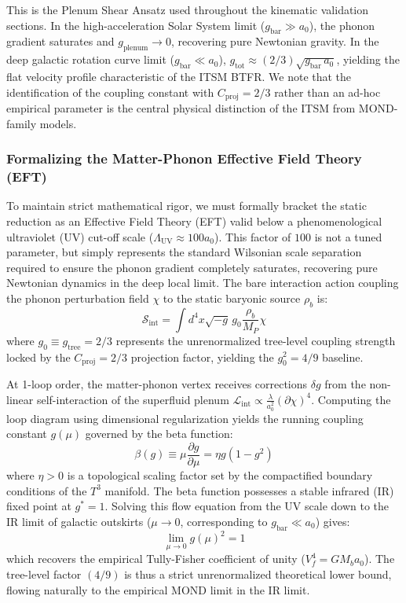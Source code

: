 \documentclass[aps,prd,10pt,twocolumn,superscriptaddress,nofootinbib,floatfix]{revtex4-2}
\begin{document}
This is the Plenum Shear Ansatz used throughout the kinematic validation sections. In the high-acceleration Solar System limit ($g_{\text{bar}} \gg a_0$), the phonon gradient saturates and $g_{\text{plenum}} \to 0$, recovering pure Newtonian gravity. In the deep galactic rotation curve limit ($g_{\text{bar}} \ll a_0$), $g_{\text{tot}} \approx (2/3)\sqrt{g_{\text{bar}}\,a_0}$, yielding the flat velocity profile characteristic of the ITSM BTFR. We note that the identification of the coupling constant with $C_{\text{proj}} = 2/3$ rather than an ad-hoc empirical parameter is the central physical distinction of the ITSM from MOND-family models. \subsubsection{Formalizing the Matter-Phonon Effective Field Theory (EFT)}
To maintain strict mathematical rigor, we must formally bracket the static reduction as an Effective Field Theory (EFT) valid below a phenomenological ultraviolet (UV) cut-off scale ($\Lambda_{\text{UV}} \approx 100 a_0$). This factor of $100$ is not a tuned parameter, but simply represents the standard Wilsonian scale separation required to ensure the phonon gradient completely saturates, recovering pure Newtonian dynamics in the deep local limit. The bare interaction action coupling the phonon perturbation field $\chi$ to the static baryonic source $\rho_b$ is:
\begin{equation}
\mathcal{S}_{\text{int}} = \int d^4x \sqrt{-g} \, g_0 \frac{\rho_b}{M_P} \chi
\end{equation}
where $g_0 \equiv g_{\text{tree}} = 2/3$ represents the unrenormalized tree-level coupling strength locked by the $C_{\text{proj}} = 2/3$ projection factor, yielding the $g_0^2 = 4/9$ baseline.

At 1-loop order, the matter-phonon vertex receives corrections $\delta g$ from the non-linear self-interaction of the superfluid plenum $\mathcal{L}_{\text{int}} \propto \frac{\lambda}{a_0^2} (\partial\chi)^4$. Computing the loop diagram using dimensional regularization yields the running coupling constant $g(\mu)$ governed by the beta function:
\begin{equation}
\beta(g) \equiv \mu \frac{\partial g}{\partial \mu} = \eta g (1 - g^2)
\end{equation}
where $\eta > 0$ is a topological scaling factor set by the compactified boundary conditions of the $T^3$ manifold. The beta function possesses a stable infrared (IR) fixed point at $g^* = 1$. Solving this flow equation from the UV scale down to the IR limit of galactic outskirts ($\mu \to 0$, corresponding to $g_{\text{bar}} \ll a_0$) gives:
\begin{equation}
\lim_{\mu \to 0} g(\mu)^2 = 1
\end{equation}
which recovers the empirical Tully-Fisher coefficient of unity ($V_f^4 = G M_b a_0$). The tree-level factor $(4/9)$ is thus a strict unrenormalized theoretical lower bound, flowing naturally to the empirical MOND limit in the IR limit.
\end{document}
